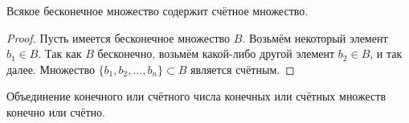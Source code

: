 \documentclass[a4paper, 14pt]{article}
\begin{document}
    \begin{theorem}
        Всякое бесконечное множество содержит счётное множество.
    \end{theorem}
    \begin{proof}
        Пусть имеется бесконечное множество $B$. Возьмём некоторый
        элемент $b_1 \in B$. Так как $B$ бесконечно, возьмём какой-либо
        другой элемент $b_2 \in B$, и так далее. Множество
        $\{b_1, b_2, \dots, b_n\} \subset B$ является счётным. 
    \end{proof}
    \begin{theorem}
        Объединение конечного или счётного числа конечных или
        счётных множеств конечно или счётно.
    \end{theorem}
\end{document}
